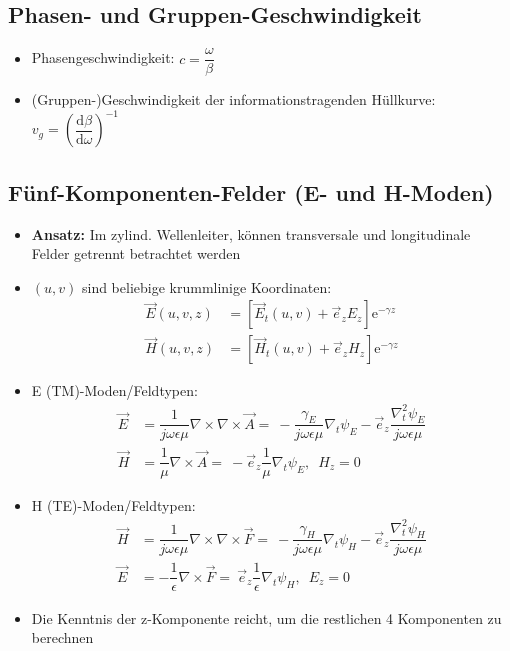 \subsection{Phasen- und Gruppen-Geschwindigkeit}
\begin{itemize}
    \itemsep0pt
    \item Phasengeschwindigkeit: \(c = \dfrac{\omega}{\beta}\)
    \item (Gruppen-)Geschwindigkeit der informationstragenden Hüllkurve:\\
        \(v_g = \left( \dfrac{\mathrm{d}\beta}{\mathrm{d}\omega} \right)^{-1}\)
\end{itemize}
\subsection{Fünf-Komponenten-Felder (E- und H-Moden)}
\begin{itemize}
    \itemsep0pt
    \item \textbf{Ansatz:} Im zylind. Wellenleiter, können transversale und longitudinale Felder getrennt betrachtet werden
    \item \((u,v)\) sind beliebige krummlinige Koordinaten:
        \begin{align*}
            \vec{E}(u, v, z) &= \left[ \vec{E}_t(u,v) + \vec{e}_z E_z \right]\mathrm{e}^{-\gamma z}\\
            \vec{H}(u, v, z) &= \left[ \vec{H}_t(u,v) + \vec{e}_z H_z \right]\mathrm{e}^{-\gamma z}
        \end{align*}
    \item E (TM)-Moden/Feldtypen:
        \begin{align*}
            \vec{E} &= \dfrac{1}{j\omega\epsilon\mu} \nabla\times\nabla\times\vec{A} =\
            -\dfrac{\gamma_E}{j\omega\epsilon\mu}\nabla_t \psi_E - \vec{e}_z \dfrac{\nabla_t^2\psi_E}{j\omega\epsilon\mu}\\
            \vec{H} &= \dfrac{1}{\mu} \nabla\times\vec{A} =\
            - \vec{e}_z \dfrac{1}{\mu}\nabla_t \psi_E,\;\
            H_z = 0
        \end{align*}
    \item H (TE)-Moden/Feldtypen:
        \begin{align*}
             \vec{H} &= \dfrac{1}{j\omega\epsilon\mu} \nabla\times\nabla\times\vec{F} =\
            -\dfrac{\gamma_H}{j\omega\epsilon\mu}\nabla_t \psi_H - \vec{e}_z \dfrac{\nabla_t^2\psi_H}{j\omega\epsilon\mu}\\
            \vec{E} &= -\dfrac{1}{\epsilon} \nabla\times\vec{F} =\
            \vec{e}_z \dfrac{1}{\epsilon}\nabla_t \psi_H,\;\
            E_z = 0
        \end{align*}
    \item Die Kenntnis der z-Komponente reicht, um die restlichen 4 Komponenten zu berechnen
\end{itemize}
